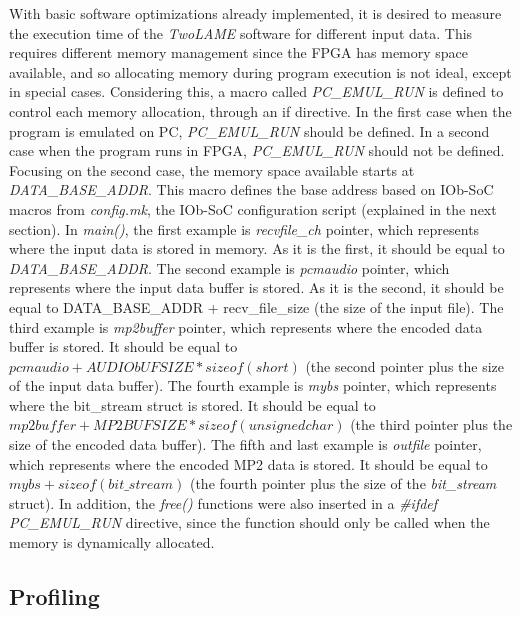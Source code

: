 With basic software optimizations already implemented, it is desired to measure the execution time of the \textit{TwoLAME} software for different input data. This requires different memory management since the FPGA has memory space available, and so allocating memory during program execution is not ideal, except in special cases. Considering this, a macro called \textit{PC\_EMUL\_RUN} is defined to control each memory allocation, through an if directive. In the first case when the program is emulated on PC, \textit{PC\_EMUL\_RUN} should be defined. In a second case when the program runs in FPGA, \textit{PC\_EMUL\_RUN} should not be defined.
Focusing on the second case, the memory space available starts at \textit{DATA\_BASE\_ADDR}. This macro defines the base address based on IOb-SoC macros from \textit{config.mk}, the IOb-SoC configuration script (explained in the next section).
In \textit{main()}, the first example is \textit{recvfile\_ch} pointer, which represents where the input data is stored in memory. As it is the first, it should be equal to \textit{DATA\_BASE\_ADDR}.
The second example is \textit{pcmaudio} pointer, which represents where the input data buffer is stored. As it is the second, it should be equal to DATA\_BASE\_ADDR + recv\_file\_size (the size of the input file).
The third example is \textit{mp2buffer} pointer, which represents where the encoded data buffer is stored. It should be equal to $pcmaudio + AUDIObUFSIZE*sizeof(short)$ (the second pointer plus the size of the input data buffer).
The fourth example is \textit{mybs} pointer, which represents where the bit\_stream struct is stored. It should be equal to $mp2buffer + MP2BUFSIZE*sizeof(unsigned char)$ (the third pointer plus the size of the encoded data buffer).
The fifth and last example is \textit{outfile} pointer, which represents where the encoded MP2 data is stored. It should be equal to $mybs + sizeof(bit\_stream)$ (the fourth pointer plus the size of the \textit{bit\_stream} struct).
In addition, the \textit{free()} functions were also inserted in a \textit{\#ifdef PC\_EMUL\_RUN} directive, since the function should only be called when the memory is dynamically allocated. \\

\subsection{Profiling}


